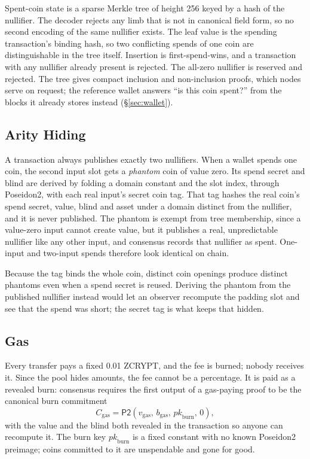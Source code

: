 \documentclass[twocolumn,10pt]{article}
\begin{document}
Spent-coin state is a sparse Merkle tree of height 256 keyed by a hash of the nullifier. The decoder rejects any limb that is not in canonical field form, so no second encoding of the same nullifier exists. The leaf value is the spending transaction's binding hash, so two conflicting spends of one coin are distinguishable in the tree itself. Insertion is first-spend-wins, and a transaction with any nullifier already present is rejected. The all-zero nullifier is reserved and rejected. The tree gives compact inclusion and non-inclusion proofs, which nodes serve on request; the reference wallet answers ``is this coin spent?'' from the blocks it already stores instead (\S\ref{sec:wallet}).

\subsection{Arity Hiding}
\label{sec:arity}

A transaction always publishes exactly two nullifiers. When a wallet spends one coin, the second input slot gets a \emph{phantom} coin of value zero. Its spend secret and blind are derived by folding a domain constant and the slot index, through Poseidon2, with each real input's secret coin tag. That tag hashes the real coin's spend secret, value, blind and asset under a domain distinct from the nullifier, and it is never published. The phantom is exempt from tree membership, since a value-zero input cannot create value, but it publishes a real, unpredictable nullifier like any other input, and consensus records that nullifier as spent. One-input and two-input spends therefore look identical on chain.

Because the tag binds the whole coin, distinct coin openings produce distinct phantoms even when a spend secret is reused. Deriving the phantom from the published nullifier instead would let an observer recompute the padding slot and see that the spend was short; the secret tag is what keeps that hidden.

\subsection{Gas}
\label{sec:gas}

Every transfer pays a fixed 0.01 ZCRYPT, and the fee is burned; nobody receives it. Since the pool hides amounts, the fee cannot be a percentage. It is paid as a revealed burn: consensus requires the first output of a gas-paying proof to be the canonical burn commitment
\[
C_{\mathrm{gas}} = \mathsf{P2}(v_{\mathrm{gas}},\, b_{\mathrm{gas}},\, \mathit{pk}_{\mathrm{burn}},\, 0),
\]
with the value and the blind both revealed in the transaction so anyone can recompute it. The burn key $\mathit{pk}_{\mathrm{burn}}$ is a fixed constant with no known Poseidon2 preimage; coins committed to it are unspendable and gone for good.
\end{document}
